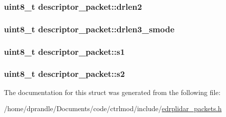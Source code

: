 \hypertarget{structdescriptor__packet_ab3437c0152e4a97a832ce80da0075da6}{
\subsubsection[{drlen2}]{\setlength{\rightskip}{0pt plus 5cm}uint8\-\_\-t descriptor\-\_\-packet\-::drlen2}}\label{structdescriptor__packet_ab3437c0152e4a97a832ce80da0075da6}
\hypertarget{structdescriptor__packet_afc7b12b3c81172ec5ebf5fe28413dcfd}{
\subsubsection[{drlen3\-\_\-smode}]{\setlength{\rightskip}{0pt plus 5cm}uint8\-\_\-t descriptor\-\_\-packet\-::drlen3\-\_\-smode}}\label{structdescriptor__packet_afc7b12b3c81172ec5ebf5fe28413dcfd}
\hypertarget{structdescriptor__packet_a3187e2d5d736ad8ad2e5bfa39832851e}{
\subsubsection[{s1}]{\setlength{\rightskip}{0pt plus 5cm}uint8\-\_\-t descriptor\-\_\-packet\-::s1}}\label{structdescriptor__packet_a3187e2d5d736ad8ad2e5bfa39832851e}
\hypertarget{structdescriptor__packet_aecf654bc09c8021678564ef2938e9190}{
\subsubsection[{s2}]{\setlength{\rightskip}{0pt plus 5cm}uint8\-\_\-t descriptor\-\_\-packet\-::s2}}\label{structdescriptor__packet_aecf654bc09c8021678564ef2938e9190}


The documentation for this struct was generated from the following file\-:\begin{DoxyCompactItemize}
\item 
/home/dprandle/\-Documents/code/ctrlmod/include/\hyperlink{edrplidar__packets_8h}{edrplidar\-\_\-packets.\-h}\end{DoxyCompactItemize}
